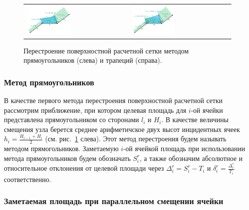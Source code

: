 \begin{figure}[ht]
\centering
\begin{tabular}{ll}
\includegraphics[width=0.45\textwidth]{fig/2dr_remesh_rectangles.pdf}
&
\includegraphics[width=0.45\textwidth]{fig/2dr_remesh_trapeziums.pdf}
\end{tabular}
\singlespacing
{}\caption{Перестроение поверхностной расчетной сетки методом прямоугольников (слева) и трапеций (справа).}
\label{fig:text_1_remesh_2d_rectangles_and_trapeziums}
\end{figure}

\subsubsection{Метод прямоугольников}

В качестве первого метода перестроения поверхностной расчетной сетки рассмотрим приближение, при котором целевая площадь для $i$-ой ячейки представлена прямоугольником со сторонами $l_i$ и $H_i$.
В качестве величины смещения узла берется среднее арифметичское двух высот инцидентных ячеек $h_i = \frac{H_{i - 1} + H_i}{2}$ (см. рис.~\ref{fig:text_1_remesh_2d_rectangles_and_trapeziums} слева).
Этот метод перестроения будем называть методом прямогольников.
Заметаемую $i$-ой ячейкой площадь при использовании метода прямоугольников будем обозначать $S_i^r$, а также обозначим абсолютное и относительное отклонения от целевой площади через $\Delta_i^r = S_i^r - T_i$ и $\delta_i^r = \frac{\Delta_i^r}{T_i}$ соответственно.

\subsubsection{Заметаемая площадь при параллельном смещении ячейки}\label{sec:text_1_geo_prim_volume}

